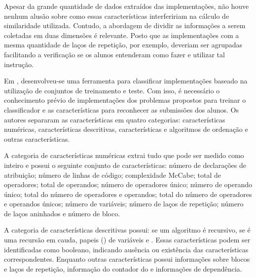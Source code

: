 		Apesar da grande quantidade de dados extraídos das implementações, não houve
		nenhum alusão sobre como essas características interfeririam na cálculo de
		similaridade utilizada. Contudo, a abordagem de dividir as informações a serem
		coletadas em duas dimensões é relevante. Posto que as implementações com
		a mesma quantidade de laços de repetição, por exemplo, deveriam ser agrupadas
		facilitando a verificação se os alunos entenderam como fazer e utilizar
		tal instrução.
		
		Em , desenvolveu-se uma ferramenta para classificar  %
		implementações baseado na utilização de conjuntos de treinamento e teste.
		Com isso, é necessário o conhecimento prévio de implementações dos problemas
		propostos para treinar o classificador e as características para reconhecer as
		submissões dos alunos. Os autores separaram as características em quatro
		categorias: características numéricas, características descritivas,
		características e algoritmos de ordenação e outras características.
		
		
		A categoria de características numéricas extrai tudo que pode ser medido
		como inteiro e possui o seguinte conjunto de características: número de
		declarações de atribuição; número de linhas de código; complexidade McCabe;
		total de operadores; total de operandos; número de operadores único; número
		de operando único; total do número de operadores e operandos; total do número
		de operadores e operandos únicos; número de variáveis; número de laços de
		repetição; número de laços aninhados e número de bloco.
		
		A categoria de características descritivas possui: se um algoritmo é
		recursivo, se é uma recursão em cauda, papeis () de variáveis
		e . Essas características podem ser identificadas como booleano,
		indicando ausência ou existência das características correspondentes. Enquanto
		outras características possui informações sobre blocos e laços de repetição,
		informação do contador do  e informações de dependência.
		
